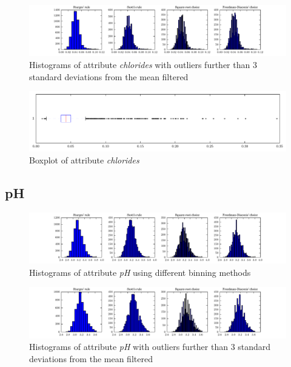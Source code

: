 \documentclass{report}
\begin{document}
\begin{figure}[H]
\includegraphics[width=\textwidth]{histograms/chlorides_filtered.pdf}
\caption{Histograms of attribute \emph{chlorides} with outliers further than 3 standard deviations from the mean filtered}\n\end{figure}

\begin{figure}[H]
\includegraphics[width=\textwidth]{boxplots/chlorides.pdf}
\caption{Boxplot of attribute \emph{chlorides}}\end{figure}

\newpage\subsection{pH}
\begin{figure}[H]
\includegraphics[width=\textwidth]{histograms/pH.pdf}
\caption{Histograms of attribute \emph{pH} using different binning methods}\end{figure}

\begin{figure}[H]
\includegraphics[width=\textwidth]{histograms/pH_filtered.pdf}
\caption{Histograms of attribute \emph{pH} with outliers further than 3 standard deviations from the mean filtered}\n\end{figure}
\end{document}
